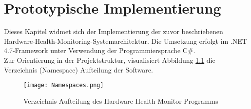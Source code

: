 \newpage
\chapter{Prototypische Implementierung}
Dieses Kapitel widmet sich der Implementierung der zuvor beschriebenen Hardware-Health-Monitoring-Systemarchitektur. Die Umsetzung erfolgt im .NET 4.7-Framework unter Verwendung der Programmiersprache C\#.\\
Zur Orientierung in der Projektstruktur, visualisiert Abbildung \ref{fig:Namespaces} die Verzeichnis (Namespace) Aufteilung der Software.  
\begin{center}
    \begin{figure}[h!]
        \centering
        \texttt{[image: Namespaces.png]}
        \caption{Verzeichnis Aufteilung des Hardware Health Monitor Programms}
        \label{fig:Namespaces}
    \end{figure}
\end{center}
